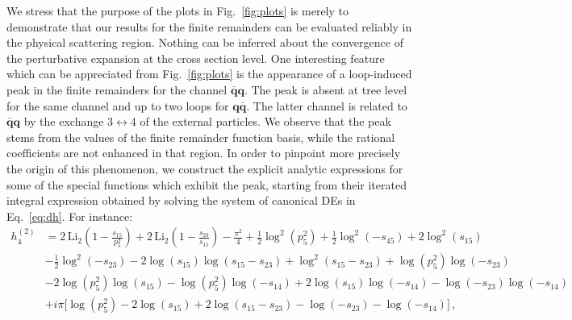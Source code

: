 \documentclass[main.tex]{subfiles}
\begin{document}
We stress that the purpose of the plots in Fig.~\ref{fig:plots} is merely to demonstrate that our results for the finite remainders can be evaluated reliably in the physical scattering region. Nothing can be inferred about the convergence of the perturbative expansion at the cross section level. One interesting feature which can be appreciated from Fig.~\ref{fig:plots} is the appearance of a loop-induced peak in the finite remainders for the channel $\mathbf{\bar{q}q}$. The peak is absent at tree level for the same channel and up to two loops for $\mathbf{q\bar{q}}$. The latter channel is related to $\mathbf{\bar{q}q}$ by the exchange $3\leftrightarrow 4$ of the external particles. We observe that the peak stems from the values of the finite remainder function basis, while the rational coefficients are not enhanced in that region. In order to pinpoint more precisely the origin of this phenomenon, we construct the explicit analytic expressions for some of the special functions which exhibit the peak, starting from their iterated integral expression obtained by solving the system of canonical DEs in Eq.~\ref{eq:dh}. For instance:
\begin{align} \label{eq:h24}
h^{(2)}_4 & = 2 \, \text{Li}_2\left( 1 - \frac{s_{15}}{p_5^2} \right) + 2 \, \text{Li}_2 \left( 1- \frac{s_{23}}{s_{15}}\right) -\frac{\pi^2}{4} + \frac{1}{2} \log^2\left( p_5^2 \right) + \frac{1}{2}\log^2\left( -s_{45}\right) + 2 \log^2\left( s_{15}\right) \nonumber \\
& - \frac{1}{2}\log^2\left( -s_{23}\right) - 2 \log\left( s_{15}\right) \log\left( s_{15} - s_{23}\right) + \log^2\left( s_{15} - s_{23}\right) + \log\left( p_5^2\right) \log\left(-s_{23}\right) \nonumber \\
& - 2 \log\left( p_5^2\right) \log\left(s_{15} \right)  - \log\left( p_5^2\right) \log\left( -s_{14}\right) +2 \log\left( s_{15}\right) \log\left( -s_{14}\right) 
 - \log\left(-s_{23}\right) \log\left( -s_{14}\right) \nonumber \\
 & +i \pi \biggl[ \log\left( p_5^2\right) - 2 \log\left( s_{15}\right) + 2 \log\left( s_{15} - s_{23}\right) - \log\left( -s_{23}\right) - \log\left( -s_{14}\right)\biggr] \,,
\end{align}
\end{document}
